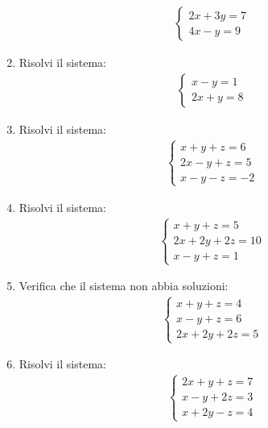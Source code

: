 \documentclass[letterpaper,10pt,italian]{jupyterBook}
\begin{document}
\begin{enumerate}
\begin{equation*}
\begin{split}
\begin{cases}
   2x + 3y = 7 \\
   4x - y = 9
   \end{cases}
   \end{split}
\end{equation*}
\item {} 
\sphinxAtStartPar
Risolvi il sistema:
\begin{equation*}
\begin{split}
   \begin{cases}
   x - y = 1 \\
   2x + y = 8
   \end{cases}
   \end{split}
\end{equation*}
\item {} 
\sphinxAtStartPar
Risolvi il sistema:
\begin{equation*}
\begin{split}
    \begin{cases}
    x + y + z = 6 \\
    2x - y + z = 5 \\
    x - y - z = -2
    \end{cases}
    \end{split}
\end{equation*}
\item {} 
\sphinxAtStartPar
Risolvi il sistema:
\begin{equation*}
\begin{split}
    \begin{cases}
    x + y + z = 5 \\
    2x + 2y + 2z = 10 \\
    x - y + z = 1
    \end{cases}
    \end{split}
\end{equation*}
\item {} 
\sphinxAtStartPar
Verifica che il sistema non abbia soluzioni:
\begin{equation*}
\begin{split}
    \begin{cases}
    x + y + z = 4 \\
    x - y + z = 6 \\
    2x + 2y + 2z = 5
    \end{cases}
    \end{split}
\end{equation*}
\item {} 
\sphinxAtStartPar
Risolvi il sistema:
\begin{equation*}
\begin{split}
    \begin{cases}
    2x + y + z = 7 \\
    x - y + 2z = 3 \\
    x + 2y - z = 4
    \end{cases}
    \end{split}
\end{equation*}
\end{enumerate}
\end{document}
